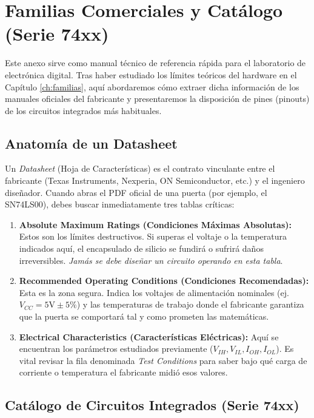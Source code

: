 \chapter{Familias Comerciales y Catálogo (Serie 74xx)}

Este anexo sirve como manual técnico de referencia rápida para el laboratorio de electrónica digital. Tras haber estudiado los límites teóricos del hardware en el Capítulo \ref{ch:familias}, aquí abordaremos cómo extraer dicha información de los manuales oficiales del fabricante y presentaremos la disposición de pines (pinouts) de los circuitos integrados más habituales.

\section{Anatomía de un Datasheet}
Un \textit{Datasheet} (Hoja de Características) es el contrato vinculante entre el fabricante (Texas Instruments, Nexperia, ON Semiconductor, etc.) y el ingeniero diseñador.
Cuando abras el PDF oficial de una puerta (por ejemplo, el SN74LS00), debes buscar inmediatamente tres tablas críticas:

\begin{enumerate}
    \item \textbf{Absolute Maximum Ratings (Condiciones Máximas Absolutas):} Estos son los límites destructivos. Si superas el voltaje o la temperatura indicados aquí, el encapsulado de silicio se fundirá o sufrirá daños irreversibles. \textit{Jamás se debe diseñar un circuito operando en esta tabla}.
    \item \textbf{Recommended Operating Conditions (Condiciones Recomendadas):} Esta es la zona segura. Indica los voltajes de alimentación nominales (ej. $V_{CC} = 5\text{V} \pm 5\%$) y las temperaturas de trabajo donde el fabricante garantiza que la puerta se comportará tal y como prometen las matemáticas.
    \item \textbf{Electrical Characteristics (Características Eléctricas):} Aquí se encuentran los parámetros estudiados previamente ($V_{IH}, V_{IL}, I_{OH}, I_{OL}$). Es vital revisar la fila denominada \textit{Test Conditions} para saber bajo qué carga de corriente o temperatura el fabricante midió esos valores.
\end{enumerate}

\section{Catálogo de Circuitos Integrados (Serie 74xx)}

